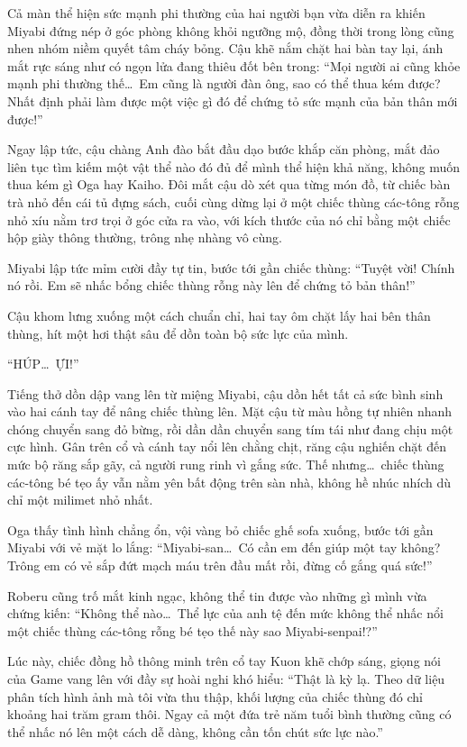 \documentclass[../main.tex]{subfiles}
\begin{document}
Cả màn thể hiện sức mạnh phi thường của hai người bạn vừa diễn ra khiến Miyabi đứng nép ở góc phòng không khỏi ngưỡng mộ, đồng thời trong lòng cũng nhen nhóm niềm quyết tâm cháy bỏng. Cậu khẽ nắm chặt hai bàn tay lại, ánh mắt rực sáng như có ngọn lửa đang thiêu đốt bên trong: ``Mọi người ai cũng khỏe mạnh phi thường thế\dots\ Em cũng là người đàn ông, sao có thể thua kém được? Nhất định phải làm được một việc gì đó để chứng tỏ sức mạnh của bản thân mới được!''

Ngay lập tức, cậu chàng Anh đào bắt đầu dạo bước khắp căn phòng, mắt đảo liên tục tìm kiếm một vật thể nào đó đủ để mình thể hiện khả năng, không muốn thua kém gì Oga hay Kaiho. Đôi mắt cậu dò xét qua từng món đồ, từ chiếc bàn trà nhỏ đến cái tủ đựng sách, cuối cùng dừng lại ở một chiếc thùng các-tông rỗng nhỏ xíu nằm trơ trọi ở góc cửa ra vào, với kích thước của nó chỉ bằng một chiếc hộp giày thông thường, trông nhẹ nhàng vô cùng.

Miyabi lập tức mỉm cười đầy tự tin, bước tới gần chiếc thùng: ``Tuyệt vời! Chính nó rồi. Em sẽ nhấc bổng chiếc thùng rỗng này lên để chứng tỏ bản thân!''

Cậu khom lưng xuống một cách chuẩn chỉ, hai tay ôm chặt lấy hai bên thân thùng, hít một hơi thật sâu để dồn toàn bộ sức lực của mình.

``HÚP\dots\ ỰI!''

Tiếng thở dồn dập vang lên từ miệng Miyabi, cậu dồn hết tất cả sức bình sinh vào hai cánh tay để nâng chiếc thùng lên. Mặt cậu từ màu hồng tự nhiên nhanh chóng chuyển sang đỏ bừng, rồi dần dần chuyển sang tím tái như đang chịu một cực hình. Gân trên cổ và cánh tay nổi lên chằng chịt, răng cậu nghiến chặt đến mức bộ răng sắp gãy, cả người rung rinh vì gắng sức. Thế nhưng\dots\ chiếc thùng các-tông bé tẹo ấy vẫn nằm yên bất động trên sàn nhà, không hề nhúc nhích dù chỉ một milimet nhỏ nhất.

Oga thấy tình hình chẳng ổn, vội vàng bỏ chiếc ghế sofa xuống, bước tới gần Miyabi với vẻ mặt lo lắng: ``Miyabi-san\dots\ Có cần em đến giúp một tay không? Trông em có vẻ sắp đứt mạch máu trên đầu mất rồi, đừng cố gắng quá sức!''

Roberu cũng trố mắt kinh ngạc, không thể tin được vào những gì mình vừa chứng kiến: ``Không thể nào\dots\ Thể lực của anh tệ đến mức không thể nhấc nổi một chiếc thùng các-tông rỗng bé tẹo thế này sao Miyabi-senpai!?''

Lúc này, chiếc đồng hồ thông minh trên cổ tay Kuon khẽ chớp sáng, giọng nói của Game vang lên với đầy sự hoài nghi khó hiểu: ``Thật là kỳ lạ. Theo dữ liệu phân tích hình ảnh mà tôi vừa thu thập, khối lượng của chiếc thùng đó chỉ khoảng hai trăm gram thôi. Ngay cả một đứa trẻ năm tuổi bình thường cũng có thể nhấc nó lên một cách dễ dàng, không cần tốn chút sức lực nào.''
\end{document}
